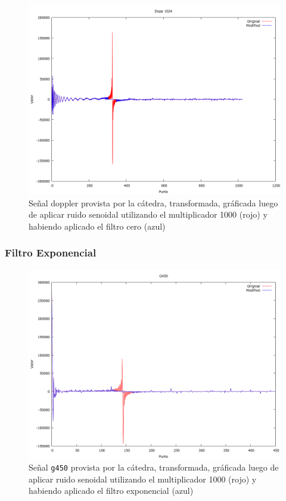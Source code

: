 \begin{figure}[H]
\begin {center}
\includegraphics[width=500pt]{imagenes/dopp1024-sin100-zero-spec.png}
\end {center}
\caption{Se\~nal doppler provista por la c\'atedra, transformada, gr\'aficada
luego de aplicar ruido senoidal utilizando el multiplicador 1000 (rojo) y 
habiendo aplicado el filtro cero (azul)}
\label{fig:Dopp1024zero}
\end{figure}


\subsubsection{Filtro Exponencial}



\begin{figure}[H]
\begin {center}
\includegraphics[width=500pt]{imagenes/g450-sin100-exp-spec.png}
\end {center}
\caption{Se\~nal \texttt{g450} provista por la c\'atedra, transformada, gr\'aficada
luego de aplicar ruido senoidal utilizando el multiplicador 1000 (rojo) y 
habiendo aplicado el filtro exponencial (azul)}
\label{fig:GexpSpec}
\end{figure}

